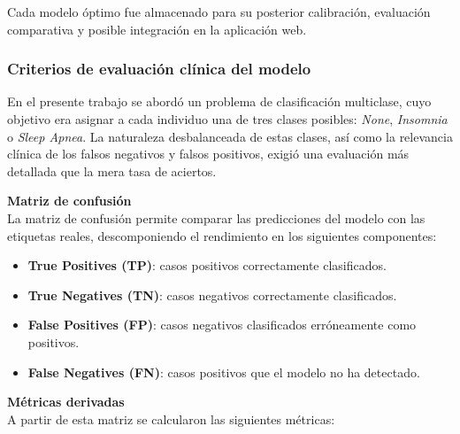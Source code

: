Cada modelo óptimo fue almacenado para su posterior calibración, evaluación comparativa y posible integración en la aplicación web.

\subsubsection{Criterios de evaluación clínica del modelo}

En el presente trabajo se abordó un problema de clasificación multiclase, cuyo objetivo era asignar a cada individuo una de tres clases posibles: \textit{None}, \textit{Insomnia} o \textit{Sleep Apnea}. La naturaleza desbalanceada de estas clases, así como la relevancia clínica de los falsos negativos y falsos positivos, exigió una evaluación más detallada que la mera tasa de aciertos.

\textbf{Matriz de confusión}\\

La matriz de confusión permite comparar las predicciones del modelo con las etiquetas reales, descomponiendo el rendimiento en los siguientes componentes:

\begin{itemize}
    \item \textbf{True Positives (TP)}: casos positivos correctamente clasificados.
    \item \textbf{True Negatives (TN)}: casos negativos correctamente clasificados.
    \item \textbf{False Positives (FP)}: casos negativos clasificados erróneamente como positivos.
    \item \textbf{False Negatives (FN)}: casos positivos que el modelo no ha detectado.
\end{itemize}

\textbf{Métricas derivadas}\\

A partir de esta matriz se calcularon las siguientes métricas:

